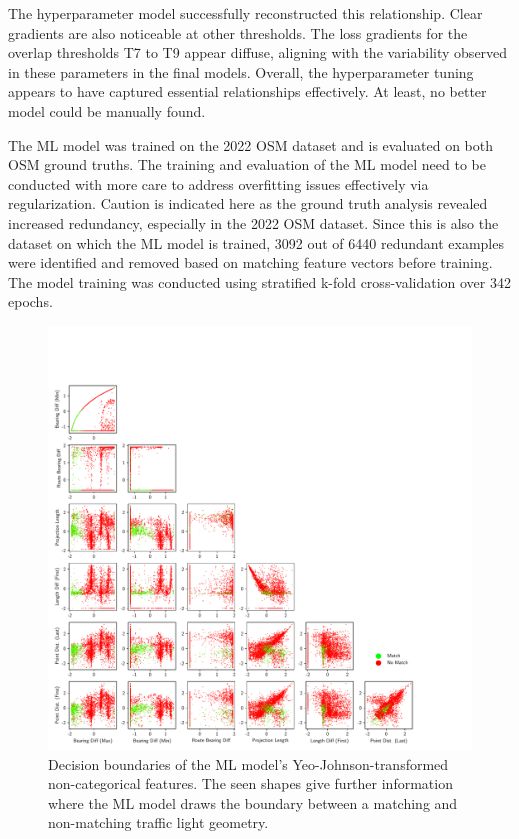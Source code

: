 The hyperparameter model successfully reconstructed this relationship. Clear gradients are also noticeable at other thresholds. The loss gradients for the overlap thresholds T7 to T9 appear diffuse, aligning with the variability observed in these parameters in the final models. Overall, the hyperparameter tuning appears to have captured essential relationships effectively. At least, no better model could be manually found.

The ML model was trained on the 2022 OSM dataset and is evaluated on both OSM ground truths. The training and evaluation of the ML model need to be conducted with more care to address overfitting issues effectively via regularization. Caution is indicated here as the ground truth analysis revealed increased redundancy, especially in the 2022 OSM dataset. Since this is also the dataset on which the ML model is trained, 3092 out of 6440 redundant examples were identified and removed based on matching feature vectors before training. The model training was conducted using stratified k-fold cross-validation over 342 epochs.

\begin{figure}[!t]
\centering 
\includegraphics[width=\linewidth,bb=0 0 760 760]{images/decision-boundaries.pdf}
\caption{Decision boundaries of the ML model's Yeo-Johnson-transformed non-categorical features. The seen shapes give further information where the ML model draws the boundary between a matching and non-matching traffic light geometry.}
\label{fig:ml-model-decision-boundaries}
\end{figure}

